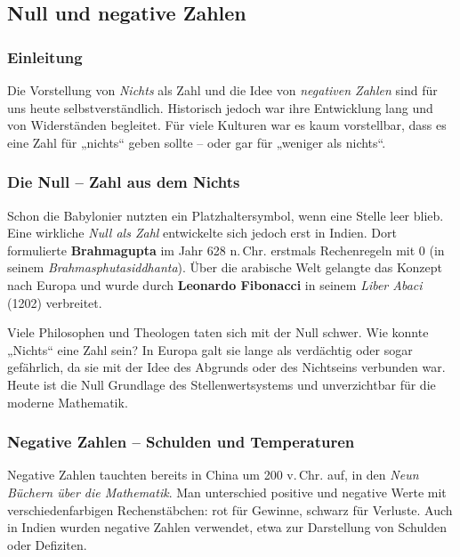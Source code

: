\subsection{Null und negative Zahlen}
\label{sec:2.3_null_negative}

\subsubsection*{Einleitung}
Die Vorstellung von \emph{Nichts} als Zahl und die Idee von \emph{negativen Zahlen} 
sind für uns heute selbstverständlich. 
Historisch jedoch war ihre Entwicklung lang und von Widerständen begleitet. 
Für viele Kulturen war es kaum vorstellbar, 
dass es eine Zahl für „nichts“ geben sollte – oder gar für „weniger als nichts“. 

\subsubsection*{Die Null – Zahl aus dem Nichts}
Schon die Babylonier nutzten ein Platzhaltersymbol, wenn eine Stelle leer blieb. 
Eine wirkliche \emph{Null als Zahl} entwickelte sich jedoch erst in Indien.  
Dort formulierte \textbf{Brahmagupta} im Jahr 628 n.\,Chr. erstmals Rechenregeln mit $0$ 
(in seinem \emph{Brahmasphutasiddhanta}).  
Über die arabische Welt gelangte das Konzept nach Europa und wurde 
durch \textbf{Leonardo Fibonacci} in seinem \emph{Liber Abaci} (1202) verbreitet.

Viele Philosophen und Theologen taten sich mit der Null schwer. 
Wie konnte „Nichts“ eine Zahl sein? 
In Europa galt sie lange als verdächtig oder sogar gefährlich, 
da sie mit der Idee des Abgrunds oder des Nichtseins verbunden war.  
Heute ist die Null Grundlage des Stellenwertsystems und 
unverzichtbar für die moderne Mathematik.

\subsubsection*{Negative Zahlen – Schulden und Temperaturen}
Negative Zahlen tauchten bereits in China um 200 v.\,Chr. auf, 
in den \emph{Neun Büchern über die Mathematik}.  
Man unterschied positive und negative Werte mit verschiedenfarbigen Rechenstäbchen: 
rot für Gewinne, schwarz für Verluste.  
Auch in Indien wurden negative Zahlen verwendet, etwa zur Darstellung von Schulden oder Defiziten. 

